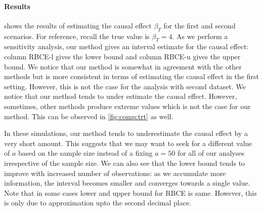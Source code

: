 \documentclass[preprint,12pt]{elsarticle}
\begin{document}
\paragraph{Results}
 shows the results of estimating the causal effect $\beta_T$
for the first and second scenarios.
For reference, recall the true value is $\beta_T=4$. 
As we perform a sensitivity analysis,
our method gives an interval estimate for the causal effect:
column RBCE-l gives the lower bound
and column RBCE-u gives the upper bound. We notice that our method is 
somewhat in agreement with the other methods but is more consistent
in terms of estimating the causal effect in the first setting. However, this is not the
case for the analysis with second dataset. We notice that our method tends to under
estimate the causal effect. However, sometimes, other methods produce extreme 
values which is not the case for our method. This can be observed in \cref{fig:comp:trt} as well. %

In these simulations, our method tends
to underestimate the causal effect by a very short amount.
This suggests that
we may want to seek for a different value of $a$ based on the sample size
instead of a fixing $a=50$ for all of our analyses irrespective of the
sample size.
We can also see that the lower bound tends to improve
with increased number of observations: as we accumulate
more information, the interval becomes smaller and converges towards
a single value. Note that in some cases lower and upper bound for 
RBCE is same. However, this is only due to approximation upto the
second decimal place.
\end{document}
